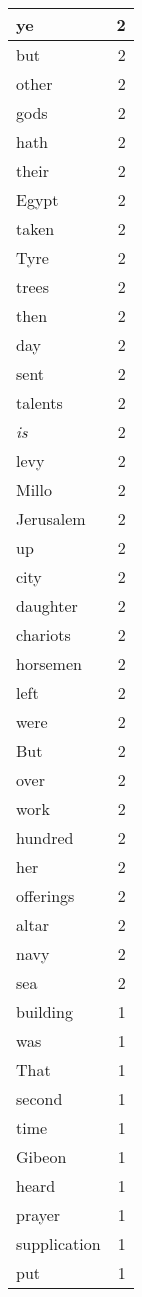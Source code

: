 \begin{center}
\begin{longtable}{l|r}
ye & 2 \\ \hline
but & 2 \\ \hline
other & 2 \\ \hline
gods & 2 \\ \hline
hath & 2 \\ \hline
their & 2 \\ \hline
Egypt & 2 \\ \hline
taken & 2 \\ \hline
Tyre & 2 \\ \hline
trees & 2 \\ \hline
then & 2 \\ \hline
day & 2 \\ \hline
sent & 2 \\ \hline
talents & 2 \\ \hline
\emph{is} & 2 \\ \hline
levy & 2 \\ \hline
Millo & 2 \\ \hline
Jerusalem & 2 \\ \hline
up & 2 \\ \hline
city & 2 \\ \hline
daughter & 2 \\ \hline
chariots & 2 \\ \hline
horsemen & 2 \\ \hline
left & 2 \\ \hline
were & 2 \\ \hline
But & 2 \\ \hline
over & 2 \\ \hline
work & 2 \\ \hline
hundred & 2 \\ \hline
her & 2 \\ \hline
offerings & 2 \\ \hline
altar & 2 \\ \hline
navy & 2 \\ \hline
sea & 2 \\ \hline
building & 1 \\ \hline
was & 1 \\ \hline
That & 1 \\ \hline
second & 1 \\ \hline
time & 1 \\ \hline
Gibeon & 1 \\ \hline
heard & 1 \\ \hline
prayer & 1 \\ \hline
supplication & 1 \\ \hline
put & 1 \\ \hline

\end{longtable}
\end{center}
